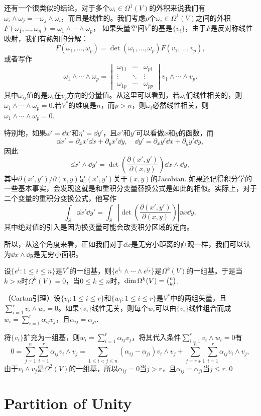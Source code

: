 \para 还有一个很类似的结论，对于多个$\omega_i \in \Omega^1(V)$的外积来说我们有$\omega_i \wedge \omega_j=-\omega_j \wedge \omega_i$，而且是线性的。我们考虑$p$个$\omega_i \in \Omega^1(V)$之间的外积$F(\omega_1, \dots,\omega_n)=\omega_1\wedge \cdots \wedge \omega_p$，
如果矢量空间$V^*$的基是$\{v_i\}$，由于$F$是反对称线性映射，我们有熟知的分解：
\[
	F(\omega_1, \dots,\omega_p)=\det(\omega_1, \dots,\omega_p)F(v_1, \dots,v_p),
\]
或者写作
\[
	\omega_1\wedge \cdots \wedge \omega_p=
	\begin{vmatrix}
		\omega_{11}&\cdots&\omega_{p1}\\
		\vdots&\ddots&\vdots\\
		\omega_{1p}&\cdots&\omega_{pp}
	\end{vmatrix}
	v_1\wedge \cdots \wedge v_p.
\]
其中$\omega_{ij}$值的是$\omega_i$在$v_j$方向的分量值。从这里可以看到，若$\omega_i$们线性相关的，则$\omega_1\wedge \cdots \wedge \omega_p=0$.若$V^*$的维度是$n$，而$p>n$，则$\omega_i$必然线性相关，则$\omega_1\wedge \cdots \wedge \omega_p=0$.

\para 特别地，如果$\omega'=\dd x'$和$\eta'=\dd y'$，且$x'$和$y'$可以看做$x$和$y$的函数，而
\[
	\dd x'=\partial_x x' \dd x+\partial_y x' \dd y,\quad \dd y'=\partial_x y' \dd x+\partial_y y' \dd y,
\]
因此
\[
	\dd x'\wedge \dd y'=\det\left(\frac{\partial(x',y')}{\partial (x,y)}\right)\dd x\wedge \dd y,
\]
其中$\partial(x',y')/\partial (x,y)$是$(x',y')$关于$(x,y)$的Jacobian. 如果还记得积分学的一些基本事实，会发现这就是和重积分变量替换公式是如此的相似。实际上，对于二个变量的重积分变换公式，他写作
\[
	\int_S\dd x' \dd y'=\int_S\left|\det\left(\frac{\partial(x',y')}{\partial (x,y)}\right)\right|\dd x \dd y,
\]
其中绝对值的引入是因为换变量可能会改变积分区域的定向。

所以，从这个角度来看，正如我们对于$\dd x$是无穷小距离的直观一样，我们可以认为$\dd x\wedge \dd y$是无穷小面积。

\para 设$\{e^i:1\leq i \leq n\}$是$V^*$的一组基，则$\{e^{i_1}\wedge \cdots \wedge e^{i_k}\}$是$\Omega^k(V)$的一组基。于是当$k>n$时$\Omega^k(V)=0$，当$0\leq k \leq n$时，$\dim \Omega^k(V)=\tbinom nk$.

\lem （Cartan引理）设$\{v_i:1\leq i \leq r\}$和$\{w_i:1\leq i \leq r\}$是$V^*$中的两组矢量，且$\sum_{i=1}^rv_i\wedge w_i=0$。如果$\{v_i\}$线性无关，则每个$w_i$可以由$\{v_i\}$线性组合而成$w_i=\sum_{i=1}^r\alpha_{ij}v_j$，且$\alpha_{ij}=\alpha_{ji}$.

\proof
	将$\{v_i\}$扩充为一组基，则$w_i=\sum_{i=1}^r\alpha_{ij}v_j$，将其代入条件$\sum_{i=1}^rv_i\wedge w_i=0$有
	\[
		0=\sum_{j=1}^n\sum_{i=1}^r \alpha_{ij}v_i \wedge v_j=\sum_{1\leq i < j \leq n}(\alpha_{ij}-\alpha_{ji}) v_i \wedge v_j+\sum_{j=r+1}^n\sum_{i=1}^r \alpha_{ij}v_i \wedge v_j,
	\]
	由于$v_i \wedge v_j$是$\Omega^2(V)$的一组基，所以$\alpha_{ij}=0$当$j>r$，且$\alpha_{ij}=\alpha_{ji}$当$j\leq r$.\qed

\section{Partition of Unity}